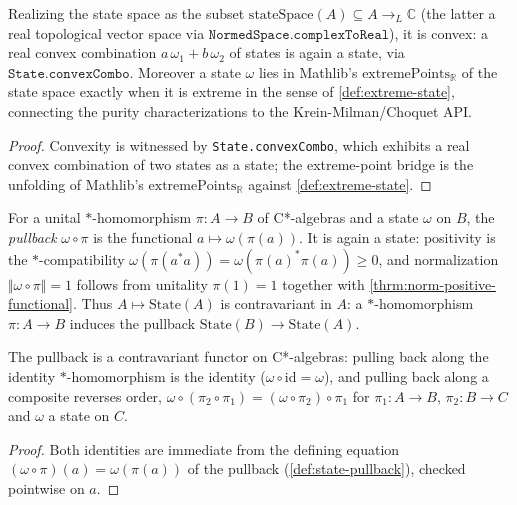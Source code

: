 \begin{theorem}
    \label{thrm:state-space-convex-bridge}
    \leanok
    Realizing the state space as the subset $\mathrm{stateSpace}(A) \subseteq A \to_L \mathbb{C}$ (the latter a real topological vector space via $\texttt{NormedSpace.complexToReal}$), it is convex: a real convex combination $a\,\omega_1 + b\,\omega_2$ of states is again a state, via $\texttt{State.convexCombo}$. Moreover a state $\omega$ lies in Mathlib's $\mathrm{extremePoints}_{\mathbb{R}}$ of the state space exactly when it is extreme in the sense of \ref{def:extreme-state}, connecting the purity characterizations to the Krein-Milman/Choquet API.
\end{theorem}
\begin{proof}
    \leanok
    Convexity is witnessed by \texttt{State.convexCombo}, which exhibits a real convex combination of two states as a state; the extreme-point bridge is the unfolding of Mathlib's $\mathrm{extremePoints}_{\mathbb{R}}$ against \ref{def:extreme-state}.
\end{proof}

\begin{definition}
    \label{def:state-pullback}
    \leanok
    For a unital $*$-homomorphism $\pi : A \to B$ of C*-algebras and a state $\omega$ on $B$, the \emph{pullback} $\omega \circ \pi$ is the functional $a \mapsto \omega(\pi(a))$. It is again a state: positivity is the $*$-compatibility $\omega(\pi(a^* a)) = \omega(\pi(a)^*\pi(a)) \ge 0$, and normalization $\Vert\omega\circ\pi\Vert = 1$ follows from unitality $\pi(1) = 1$ together with \ref{thrm:norm-positive-functional}. Thus $A \mapsto \mathrm{State}(A)$ is contravariant in $A$: a $*$-homomorphism $\pi : A \to B$ induces the pullback $\mathrm{State}(B) \to \mathrm{State}(A)$.
\end{definition}

\begin{theorem}
    \label{thrm:state-pullback-functorial}
    \leanok
    The pullback is a contravariant functor on C*-algebras: pulling back along the identity $*$-homomorphism is the identity ($\omega \circ \mathrm{id} = \omega$), and pulling back along a composite reverses order, $\omega \circ (\pi_2 \circ \pi_1) = (\omega \circ \pi_2) \circ \pi_1$ for $\pi_1 : A \to B$, $\pi_2 : B \to C$ and $\omega$ a state on $C$.
\end{theorem}
\begin{proof}
    \leanok
    Both identities are immediate from the defining equation $(\omega \circ \pi)(a) = \omega(\pi(a))$ of the pullback (\ref{def:state-pullback}), checked pointwise on $a$.
\end{proof}

